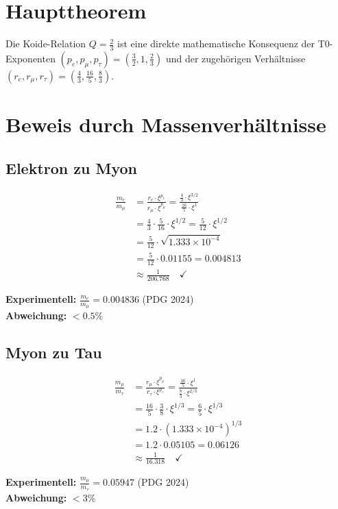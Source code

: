 	\section{Haupttheorem}
	
	\begin{theorem}
		Die Koide-Relation $Q = \frac{2}{3}$ ist eine direkte mathematische Konsequenz der T0-Exponenten $(p_e, p_\mu, p_\tau) = \left(\frac{3}{2}, 1, \frac{2}{3}\right)$ und der zugehörigen Verhältnisse $(r_e, r_\mu, r_\tau) = \left(\frac{4}{3}, \frac{16}{5}, \frac{8}{3}\right)$.
	\end{theorem}
	
	\section{Beweis durch Massenverhältnisse}
	
	\subsection{Elektron zu Myon}
	
	\begin{beweis}
		\begin{align}
			\frac{m_e}{m_\mu} &= \frac{r_e \cdot \xi^{p_e}}{r_\mu \cdot \xi^{p_\mu}} = \frac{\frac{4}{3} \cdot \xi^{3/2}}{\frac{16}{5} \cdot \xi^1} \\
			&= \frac{4}{3} \cdot \frac{5}{16} \cdot \xi^{1/2} = \frac{5}{12} \cdot \xi^{1/2} \\
			&= \frac{5}{12} \cdot \sqrt{1.333 \times 10^{-4}} \\
			&= \frac{5}{12} \cdot 0.01155 = 0.004813 \\
			&\approx \frac{1}{206.768} \quad \checkmark
		\end{align}
		
		\textbf{Experimentell:} $\frac{m_e}{m_\mu} = 0.004836$ (PDG 2024)\\
		\textbf{Abweichung:} $< 0.5\%$
	\end{beweis}
	
	\subsection{Myon zu Tau}
	
	\begin{beweis}
		\begin{align}
			\frac{m_\mu}{m_\tau} &= \frac{r_\mu \cdot \xi^{p_\mu}}{r_\tau \cdot \xi^{p_\tau}} = \frac{\frac{16}{5} \cdot \xi^1}{\frac{8}{3} \cdot \xi^{2/3}} \\
			&= \frac{16}{5} \cdot \frac{3}{8} \cdot \xi^{1/3} = \frac{6}{5} \cdot \xi^{1/3} \\
			&= 1.2 \cdot (1.333 \times 10^{-4})^{1/3} \\
			&= 1.2 \cdot 0.05105 = 0.06126 \\
			&\approx \frac{1}{16.318} \quad \checkmark
		\end{align}
		
		\textbf{Experimentell:} $\frac{m_\mu}{m_\tau} = 0.05947$ (PDG 2024)\\
		\textbf{Abweichung:} $< 3\%$
	\end{beweis}
	
